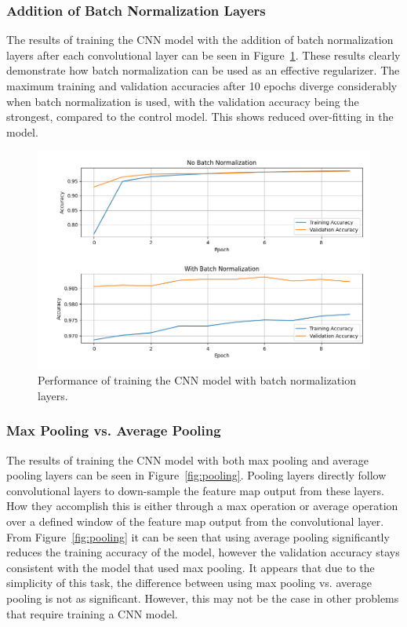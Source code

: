 \documentclass[a4paper]{article}
\begin{document}
\subsubsection{Addition of Batch Normalization Layers}

The results of training the CNN model with the addition of batch normalization layers after each convolutional layer can be seen in Figure~\ref{fig:batch-norm}. These results clearly demonstrate how batch normalization can be used as an effective regularizer. The maximum training and validation accuracies after 10 epochs diverge considerably when batch normalization is used, with the validation accuracy being the strongest, compared to the control model. This shows reduced over-fitting in the model.

\begin{figure}[h!]
    \centering
    \includegraphics[scale=0.5]{images/batch-norm-cnn.png}
    \caption{Performance of training the CNN model with batch normalization layers.}
    \label{fig:batch-norm}
\end{figure}

\subsubsection{Max Pooling vs. Average Pooling}

The results of training the CNN model with both max pooling and average pooling layers can be seen in Figure~\ref{fig:pooling}. Pooling layers directly follow convolutional layers to down-sample the feature map output from these layers. How they accomplish this is either through a max operation or average operation over a defined window of the feature map output from the convolutional layer. From Figure~\ref{fig:pooling} it can be seen that using average pooling significantly reduces the training accuracy of the model, however the validation accuracy stays consistent with the model that used max pooling. It appears that due to the simplicity of this task, the difference between using max pooling vs. average pooling is not as significant. However, this may not be the case in other problems that require training a CNN model.
\end{document}
